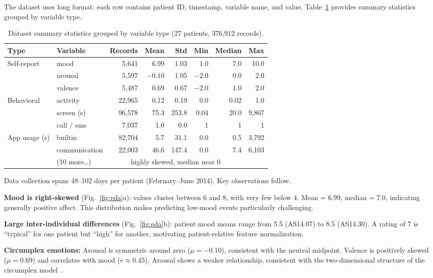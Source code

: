 \documentclass[runningheads]{llncs}
\begin{document}
The dataset uses long format: each row contains patient ID, timestamp, variable name, and value. Table~\ref{tab:summary} provides summary statistics grouped by variable type.

\begin{table}[H]
\centering
\caption{Dataset summary statistics grouped by variable type (27 patients, 376,912 records).}\label{tab:summary}
\begin{tabular}{llrrrrrr}
\toprule
Type & Variable & Records & Mean & Std & Min & Median & Max \\
\midrule
\multirow{3}{*}{Self-report} & mood & 5,641 & 6.99 & 1.03 & 1.0 & 7.0 & 10.0 \\
 & arousal & 5,597 & $-0.10$ & 1.05 & $-2.0$ & 0.0 & 2.0 \\
 & valence & 5,487 & 0.69 & 0.67 & $-2.0$ & 1.0 & 2.0 \\
\midrule
Behavioral & activity & 22,965 & 0.12 & 0.19 & 0.0 & 0.02 & 1.0 \\
 & screen (s) & 96,578 & 75.3 & 253.8 & 0.04 & 20.0 & 9,867 \\
 & call / sms & 7,037 & 1.0 & 0.0 & 1 & 1 & 1 \\
\midrule
\multirow{2}{*}{App usage (s)} & builtin & 82,704 & 5.7 & 31.1 & 0.0 & 0.5 & 3,792 \\
 & communication & 22,003 & 46.6 & 147.4 & 0.0 & 7.4 & 6,103 \\
 & (10 more\ldots) & \multicolumn{5}{c}{highly skewed, median near 0} & \\
\bottomrule
\end{tabular}
\end{table}

Data collection spans 48--102 days per patient (February--June 2014). Key observations follow.

\textbf{Mood is right-skewed} (Fig.~\ref{fig:eda}a): values cluster between 6 and 8, with very few below 4. Mean = 6.99, median = 7.0, indicating generally positive affect. This distribution makes predicting low-mood events particularly challenging.

\textbf{Large inter-individual differences} (Fig.~\ref{fig:eda}b): patient mood means range from 5.5 (AS14.07) to 8.5 (AS14.30). A rating of 7 is ``typical'' for one patient but ``high'' for another, motivating patient-relative feature normalization.

\textbf{Circumplex emotions:} Arousal is symmetric around zero ($\mu = -0.10$), consistent with the neutral midpoint. Valence is positively skewed ($\mu = 0.69$) and correlates with mood ($r \approx 0.45$). Arousal shows a weaker relationship, consistent with the two-dimensional structure of the circumplex model~\cite{russell1980}.
\end{document}
